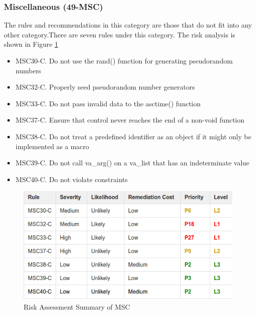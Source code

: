 			\subsubsection{Miscellaneous (49-MSC)} The rules and recommendations in this category are those that do not fit into any other category.There are seven rules under this category. The risk analysis is shown in Figure \ref{fig:15}\cite{cert-c}
				\begin{itemize}
					\item MSC30-C. Do not use the rand() function for generating pseudorandom numbers
					
					\item MSC32-C. Properly seed pseudorandom number generators
					
					\item MSC33-C. Do not pass invalid data to the asctime() function
					
					\item MSC37-C. Ensure that control never reaches the end of a non-void function
					
					\item MSC38-C. Do not treat a predefined identifier as an object if it might only be implemented as a macro
					
					\item MSC39-C. Do not call va\_arg() on a va\_list that has an indeterminate value
					
					\item MSC40-C. Do not violate constraints
				\end{itemize}
				\begin{figure}[H]
					
					
					\centering
					\includegraphics[width=.6\linewidth]{Figures/msc}
					\caption{Risk Assessment Summary of MSC}
					\label{fig:15}
					
				\end{figure}
